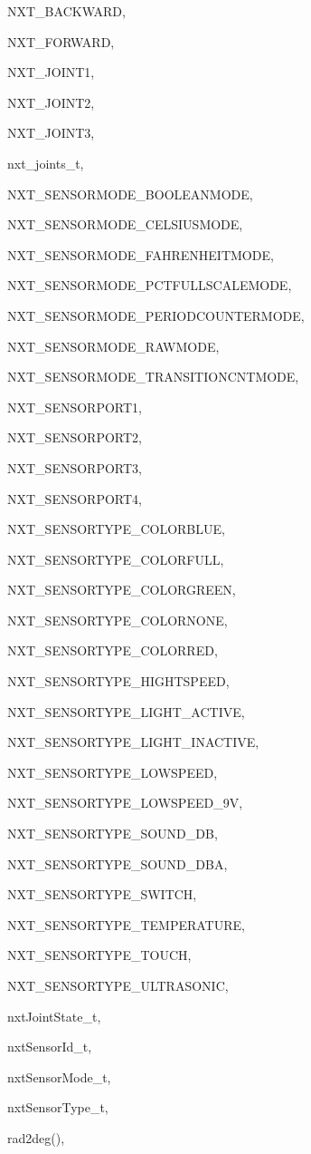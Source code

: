 \begin{theindex}
  \item NXT\_BACKWARD, 
  \item NXT\_FORWARD, 
  \item NXT\_JOINT1, 
  \item NXT\_JOINT2, 
  \item NXT\_JOINT3, 
  \item nxt\_joints\_t, 
  \item NXT\_SENSORMODE\_BOOLEANMODE, 
  \item NXT\_SENSORMODE\_CELSIUSMODE, 
  \item NXT\_SENSORMODE\_FAHRENHEITMODE, 
  \item NXT\_SENSORMODE\_PCTFULLSCALEMODE, 
  \item NXT\_SENSORMODE\_PERIODCOUNTERMODE, 
  \item NXT\_SENSORMODE\_RAWMODE, 
  \item NXT\_SENSORMODE\_TRANSITIONCNTMODE, 
  \item NXT\_SENSORPORT1, 
  \item NXT\_SENSORPORT2, 
  \item NXT\_SENSORPORT3, 
  \item NXT\_SENSORPORT4, 
  \item NXT\_SENSORTYPE\_COLORBLUE, 
  \item NXT\_SENSORTYPE\_COLORFULL, 
  \item NXT\_SENSORTYPE\_COLORGREEN, 
  \item NXT\_SENSORTYPE\_COLORNONE, 
  \item NXT\_SENSORTYPE\_COLORRED, 
  \item NXT\_SENSORTYPE\_HIGHTSPEED, 
  \item NXT\_SENSORTYPE\_LIGHT\_ACTIVE, 
  \item NXT\_SENSORTYPE\_LIGHT\_INACTIVE, 
  \item NXT\_SENSORTYPE\_LOWSPEED, 
  \item NXT\_SENSORTYPE\_LOWSPEED\_9V, 
  \item NXT\_SENSORTYPE\_SOUND\_DB, 
  \item NXT\_SENSORTYPE\_SOUND\_DBA, 
  \item NXT\_SENSORTYPE\_SWITCH, 
  \item NXT\_SENSORTYPE\_TEMPERATURE, 
  \item NXT\_SENSORTYPE\_TOUCH, 
  \item NXT\_SENSORTYPE\_ULTRASONIC, 
  \item nxtJointState\_t, 
  \item nxtSensorId\_t, 
  \item nxtSensorMode\_t, 
  \item nxtSensorType\_t, 

  \indexspace

  \item rad2deg(), 

\end{theindex}
